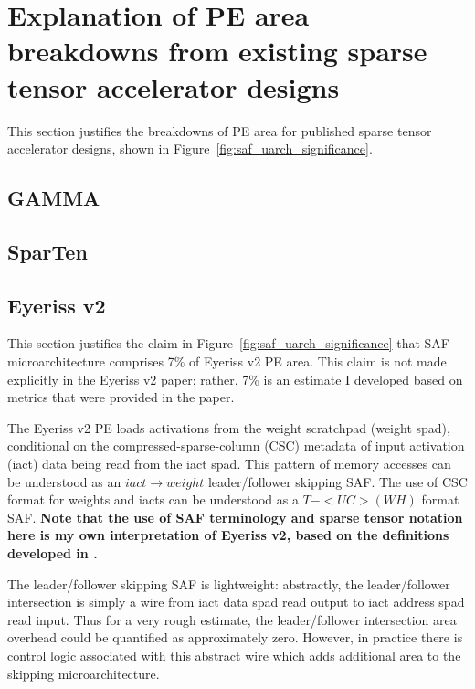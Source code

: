 \chapter{Explanation of PE area breakdowns from existing sparse tensor accelerator designs}

This section justifies the breakdowns of PE area for published sparse tensor accelerator designs, shown in Figure~\ref{fig:saf_uarch_significance}.

\section{GAMMA\cite{gamma}}

\section{SparTen\cite{sparten}}

\section{Eyeriss v2\cite{eyerissv2}}

This section justifies the claim in Figure~\ref{fig:saf_uarch_significance} that SAF microarchitecture comprises 7\% of Eyeriss v2 PE area. This claim is not made explicitly in the Eyeriss v2 paper\cite{eyerissv2}; rather, 7\% is an estimate I developed based on metrics that were provided in the paper.

The Eyeriss v2 PE loads activations from the weight scratchpad (weight spad), conditional on the compressed-sparse-column (CSC) metadata of input activation (iact) data being read from the iact spad\cite{eyerissv2}. This pattern of memory accesses can be understood as an $iact \rightarrow weight$ leader/follower skipping SAF. The use of CSC format for weights and iacts can be understood as a $T-<UC>(WH)$ format SAF. \textbf{Note that the use of SAF terminology and sparse tensor notation here is my own interpretation of Eyeriss v2, based on the definitions developed in \cite{sparseloop}\cite{szebook}.}

The leader/follower skipping SAF is lightweight: abstractly, the leader/follower intersection is simply a wire from iact data spad read output to iact address spad read input. Thus for a very rough estimate, the leader/follower intersection area overhead could be quantified as approximately zero. However, in practice there is control logic associated with this abstract wire which adds additional area to the skipping microarchitecture. 


